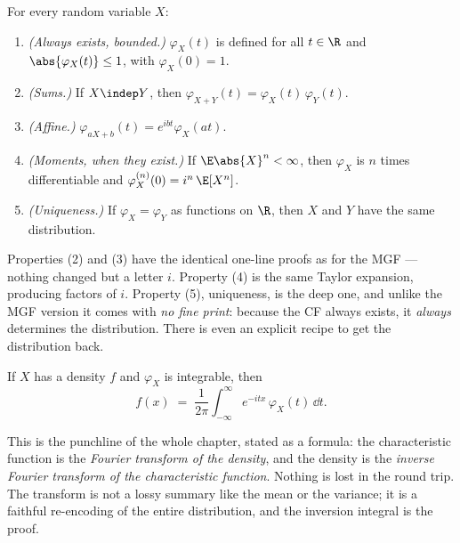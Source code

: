 \begin{theorem}
\label{ch18:thm-cf-props}
For every random variable $X$:
\begin{enumerate}
  \item \emph{(Always exists, bounded.)} $\varphi_X(t)$ is defined for all
        $t\in\R$ and $\abs{\varphi_X(t)}\le 1$, with $\varphi_X(0)=1$.
  \item \emph{(Sums.)} If $X\indep Y$, then
        $\varphi_{X+Y}(t)=\varphi_X(t)\,\varphi_Y(t)$.
  \item \emph{(Affine.)} $\varphi_{aX+b}(t)=e^{ibt}\varphi_X(at)$.
  \item \emph{(Moments, when they exist.)} If $\E\abs{X}^n<\infty$, then
        $\varphi_X$ is $n$ times differentiable and
        $\varphi_X^{(n)}(0)=i^n\,\E[X^n]$.
  \item \emph{(Uniqueness.)} If $\varphi_X=\varphi_Y$ as functions on $\R$, then
        $X$ and $Y$ have the same distribution.
\end{enumerate}
\end{theorem}

Properties (2) and (3) have the identical one-line proofs as for the MGF ---
nothing changed but a letter $i$. Property (4) is the same Taylor expansion,
producing factors of $i$. Property (5), uniqueness, is the deep one, and unlike
the MGF version it comes with \emph{no fine print}: because the CF always
exists, it \emph{always} determines the distribution. There is even an explicit
recipe to get the distribution back.

\begin{theorem}
\label{ch18:thm-inversion}
If $X$ has a density $f$ and $\varphi_X$ is integrable, then
\[
  f(x) \;=\; \frac{1}{2\pi}\int_{-\infty}^\infty e^{-itx}\,\varphi_X(t)\,\dd t .
\]
\end{theorem}

This is the punchline of the whole chapter, stated as a formula: the
characteristic function is the \emph{Fourier transform of the density}, and the
density is the \emph{inverse Fourier transform of the characteristic function}.
Nothing is lost in the round trip. The transform is not a lossy summary like the
mean or the variance; it is a faithful re-encoding of the entire distribution,
and the inversion integral is the proof.

